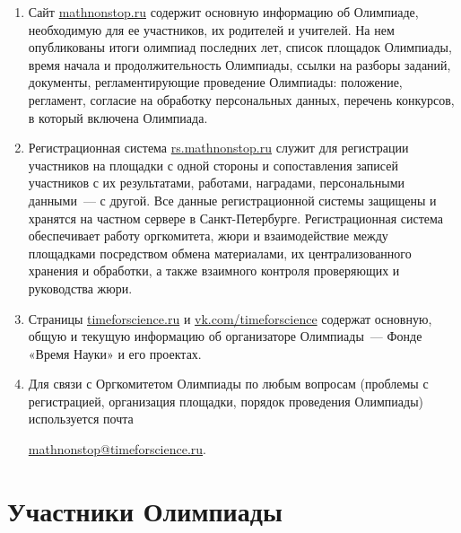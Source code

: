 \documentclass[a4paper,12pt]{article}
\newcommand{\surl}[1]{{\small\url{#1}}}
\begin{document}
\begin{enumerate}
	\item Сайт \surl{mathnonstop.ru} содержит основную информацию об Олимпиаде, необходимую для ее участников, их родителей и учителей. На нем опубликованы итоги олимпиад последних лет, список площадок Олимпиады, время начала и продолжительность Олимпиады, ссылки на разборы заданий, документы, регламентирующие проведение Олимпиады: положение, регламент, согласие на обработку персональных данных, перечень конкурсов, в который включена Олимпиада.
	\item Регистрационная система \surl{rs.mathnonstop.ru} служит для регистрации участников на площадки с одной стороны и сопоставления записей участников с их результатами, работами, наградами, персональными данными~— с другой. Все данные регистрационной системы защищены и хранятся на частном сервере в Санкт-Петербурге. Регистрационная система обеспечивает работу оргкомитета, жюри и взаимодействие между площадками посредством обмена материалами, их централизованного хранения и обработки, а также взаимного контроля проверяющих и руководства жюри.
	\item Страницы \surl{timeforscience.ru} и \surl{vk.com/timeforscience} содержат основную, общую и текущую информацию об организаторе Олимпиады~— Фонде «Время Науки» и его проектах.
	\item Для связи с Оргкомитетом Олимпиады по любым вопросам (проблемы с регистрацией, организация площадки, порядок проведения Олимпиады) используется почта \\
	\centerline{\surl{mathnonstop@timeforscience.ru}.}
\end{enumerate}

\section{Участники Олимпиады}
\end{document}
